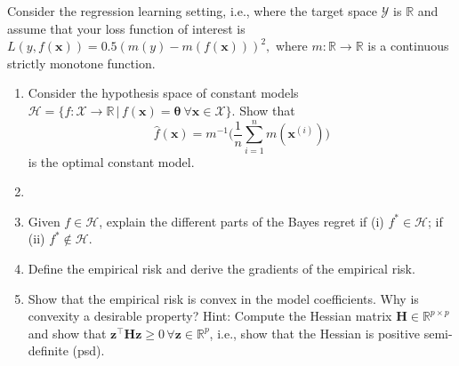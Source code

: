 


Consider the regression learning setting, i.e., where the target space $\mathcal{Y}$ is $\mathbb{R}$
and assume that your loss function of interest is $L(y,f(\bm{x}))= 0.5 (m(y)-m(f(\bm{x})))^2,$ where $m:\mathbb{R} \to \mathbb{R}$ is a continuous strictly monotone function.
%


\begin{enumerate}
	\item Consider the hypothesis space of constant models 
	$\mathcal{H} = \{ f:\mathcal{X} \to \mathbb{R} \, | \,  f(\bm{x}) = \bm{\theta}  \ \forall \bm{x} \in \mathcal{X}  \}.$ 
	Show that 
	$$\hat{f}(\bm{x}) = m^{-1}\big(  \frac1n \sum_{i=1}^n m(\bm{x}^{(i)})  \big)$$
	is the optimal constant model.
	\item 
	\item Given $f \in \mathcal{H}$, explain the different parts of the Bayes regret if (i) $f^\ast \in \mathcal{H}$; if (ii) $f^\ast \notin \mathcal{H}$.
	\item Define the empirical risk and derive the gradients of the empirical risk.
	\item Show that the empirical risk is convex in the model coefficients. Why is convexity a desirable property? Hint: Compute the Hessian matrix $\bm{H} \in \mathbb{R}^{p \times p}$ and show that $\bm{z}^\top \bm{H} \bm{z} \geq 0 \, \forall \bm{z} \in \mathbb{R}^p$, i.e., show that the Hessian is positive semi-definite (psd).  
\end{enumerate}
